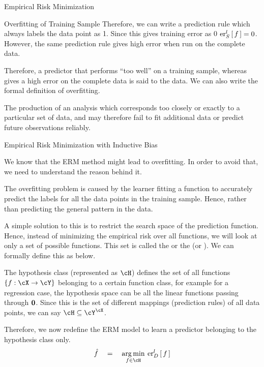 \documentclass[11pt,a4paper]{article}
\begin{document}
\begin{ssection}{Empirical Risk Minimization}
\begin{ssubsection}{Overfitting of Training Sample}
		Therefore, we can write a prediction rule which always labels the data point as 1. Since this gives training error as 0  $\err[_S^l]{f} = 0$. However, the same prediction rule gives high error when run on the complete data.

		Therefore, a predictor that performs ``too well'' on a training sample, whereas gives a high error on the complete data is said to  the data. We can also write the formal definition of overfitting.

		\begin{definition}
			The production of an analysis which corresponds too closely or exactly to a particular set of data, and may therefore fail to fit additional data or predict future observations reliably.
		\end{definition}

	\end{ssubsection}

	\begin{ssubsection}{Empirical Risk Minimization with Inductive Bias}

		We know that the ERM method might lead to overfitting. In order to avoid that, we need to understand the reason behind it.

		The overfitting problem is caused by the learner fitting a function to accurately predict the labels for all the data points in the training sample. Hence, rather than predicting the general pattern in the data.

		A simple solution to this is to restrict the search space of the prediction function. Hence, instead of minimizing the empirical risk over all functions, we will look at only a set of possible functions. This set is called the  or the  (or ). We can formally define this as below.

		\begin{definition}
			The hypothesis class (represented as $\cH$) defines the set of all functions $\set{f : \cX \ra \cY}$ belonging to a certain function class, for example for a regression case, the hypothesis space can be all the linear functions passing through $\vzero$. Since this is the set of different mappings (prediction rules) of all data points, we can say $\cH \subseteq \cY^\cX$.
		\end{definition}

		Therefore, we now redefine the ERM model to learn a predictor belonging to the hypothesis class only.
		\begin{align*}
			\hat{f}	\eq	\argmin{f \in \cH} \err[_D^l]{f}
		\end{align*}


\end{ssubsection}
\end{ssection}
\end{document}
